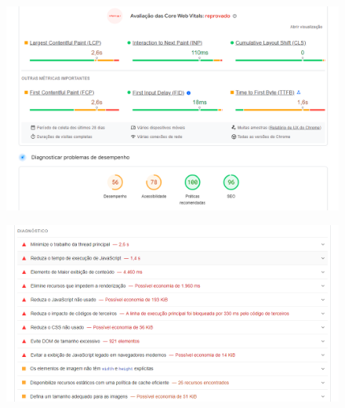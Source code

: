 \documentclass{article}
\begin{document}
\begin{figure}[H]
      \centering
      \includegraphics [width=1\textwidth]{IMGDOC/AnaliseMochileiros1.png}
      \label{pesq1 mochi}
\end{figure}
\begin{figure}[H]
      \centering
      \includegraphics [width=1\textwidth]{IMGDOC/AnaliseMochileiros2.png}
      \label{pesq2 mochi}
\end{figure}
\end{document}
